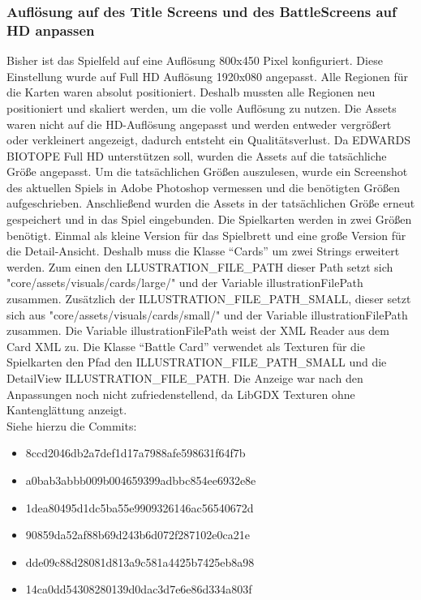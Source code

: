 \subsubsection{Auflösung auf des Title Screens und des BattleScreens auf HD anpassen}
Bisher ist das Spielfeld auf eine Auflösung 800x450 Pixel konfiguriert. Diese Einstellung wurde auf Full HD Auflösung 1920x080 angepasst. Alle Regionen für die Karten waren absolut positioniert. Deshalb mussten alle Regionen neu positioniert und skaliert werden, um die volle Auflösung zu nutzen. 
Die Assets waren nicht auf die HD-Auflösung angepasst und werden entweder vergrößert oder verkleinert angezeigt, dadurch entsteht ein Qualitätsverlust. Da EDWARDS BIOTOPE Full HD unterstützen soll, wurden die Assets auf die tatsächliche Größe angepasst. Um die tatsächlichen Größen auszulesen, wurde ein Screenshot des aktuellen Spiels in Adobe Photoshop vermessen und die benötigten Größen aufgeschrieben. Anschließend wurden die Assets in der tatsächlichen Größe erneut gespeichert und in das Spiel eingebunden. Die Spielkarten werden in zwei Größen benötigt. Einmal als kleine Version für das Spielbrett und eine große Version für die Detail-Ansicht. Deshalb muss die Klasse “Cards” um zwei Strings erweitert werden. Zum einen den LLUSTRATION\_FILE\_PATH dieser Path setzt sich "core/assets/visuals/cards/large/" und der Variable illustrationFilePath zusammen. Zusätzlich der ILLUSTRATION\_FILE\_PATH\_SMALL, dieser setzt sich aus "core/assets/visuals/cards/small/" und der Variable illustrationFilePath zusammen. Die Variable illustrationFilePath weist der XML Reader aus dem Card XML zu. Die Klasse “Battle Card” verwendet als Texturen für die Spielkarten den Pfad den ILLUSTRATION\_FILE\_PATH\_SMALL und die DetailView ILLUSTRATION\_FILE\_PATH. 
Die Anzeige war nach den Anpassungen noch nicht zufriedenstellend, da LibGDX Texturen ohne Kantenglättung anzeigt.\\
Siehe hierzu die Commits:
\begin{itemize}
\item 8ccd2046db2a7def1d17a7988afe598631f64f7b
\item a0bab3abbb009b004659399adbbc854ee6932e8e
\item 1dea80495d1dc5ba55e9909326146ac56540672d
\item 90859da52af88b69d243b6d072f287102e0ca21e
\item dde09c88d28081d813a9c581a4425b7425eb8a98
\item 14ca0dd54308280139d0dac3d7e6e86d334a803f
\end{itemize}

